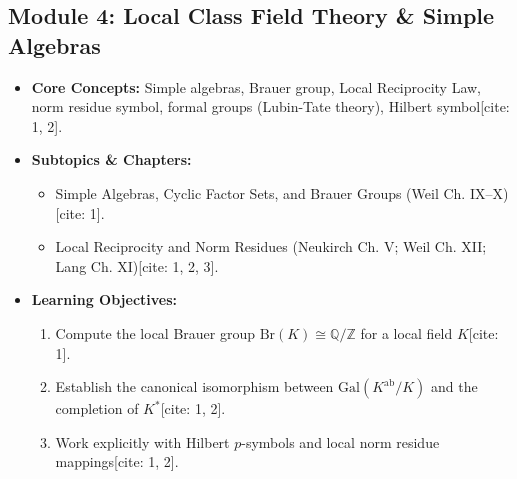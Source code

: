 \documentclass[11pt,a4paper]{article}
\begin{document}
\subsection*{Module 4: Local Class Field Theory \& Simple Algebras}
\begin{itemize}[leftmargin=*]
    \item \textbf{Core Concepts:} Simple algebras, Brauer group, Local Reciprocity Law, norm residue symbol, formal groups (Lubin-Tate theory), Hilbert symbol[cite: 1, 2].
    \item \textbf{Subtopics \& Chapters:}
    \begin{itemize}
        \item Simple Algebras, Cyclic Factor Sets, and Brauer Groups (Weil Ch. IX--X)[cite: 1].
        \item Local Reciprocity and Norm Residues (Neukirch Ch. V; Weil Ch. XII; Lang Ch. XI)[cite: 1, 2, 3].
    \end{itemize}
    \item \textbf{Learning Objectives:}
    \begin{enumerate}
        \item Compute the local Brauer group $\text{Br}(K) \cong \mathbb{Q}/\mathbb{Z}$ for a local field $K$[cite: 1].
        \item Establish the canonical isomorphism between $\text{Gal}(K^{\text{ab}}/K)$ and the completion of $K^*$[cite: 1, 2].
        \item Work explicitly with Hilbert $p$-symbols and local norm residue mappings[cite: 1, 2].
    \end{enumerate}
\end{itemize}
\end{document}
